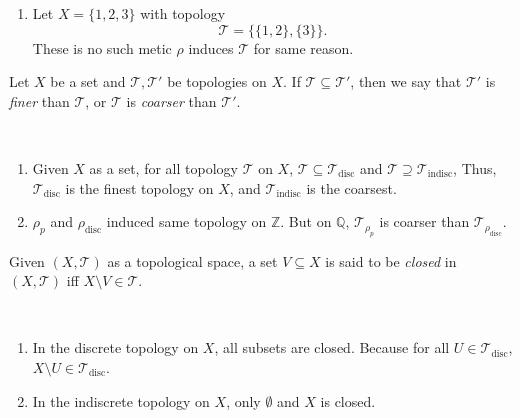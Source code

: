\begin{note}
\begin{enumerate}
		\item Let $X = \{1,2,3\}$ with topology
		$$
		\mathcal T = \big\{ \{1,2\}, \{3\} \big\}.
		$$
		These is no such metic $\rho$ induces $\mathcal T$ for same reason.
	\end{enumerate}
\end{note}


\begin{definition}
	Let $X$ be a set and $\mathcal T, \mathcal T'$ be topologies on $X$. If $\mathcal T \subseteq \mathcal T'$, then we say that $\mathcal T'$ is \textit{finer} than $\mathcal T$, or $\mathcal T$ is \textit{coarser} than $\mathcal T'$.
\end{definition}


\begin{note} \
	\begin{enumerate}
		\item Given $X$ as a set, for all topology $\mathcal T$ on $X$, $\mathcal T \subseteq \mathcal T_\mathrm{disc}$ and $\mathcal T \supseteq \mathcal T_\mathrm{indisc}$, Thus, $\mathcal T_\mathrm{disc}$ is the finest topology on $X$, and $\mathcal T_\text{indisc}$ is the coarsest.
		
		\item $\rho_p$ and $\rho_\text{disc}$ induced same topology on $\mathbb Z$. But on $\mathbb Q$, $\mathcal T_{\rho_p}$ is coarser than $\mathcal T_{\rho_\text{disc}}$.
	\end{enumerate}
\end{note}


\begin{definition}
	Given $(X, \mathcal T)$ as a topological space, a set $V \subseteq X$ is said to be \textit{closed} in $(X, \mathcal T)$ iff $X \setminus V \in \mathcal T$.
\end{definition}


\begin{definition} \
	\begin{enumerate}
		\item In the discrete topology on $X$, all subsets are closed. Because for all $U \in \mathcal T_\text{disc}$, $X \setminus U \in \mathcal T_\text{disc}$.
		\item In the indiscrete topology on $X$, only $\emptyset$ and $X$ is closed.
	\end{enumerate}
\end{definition}


